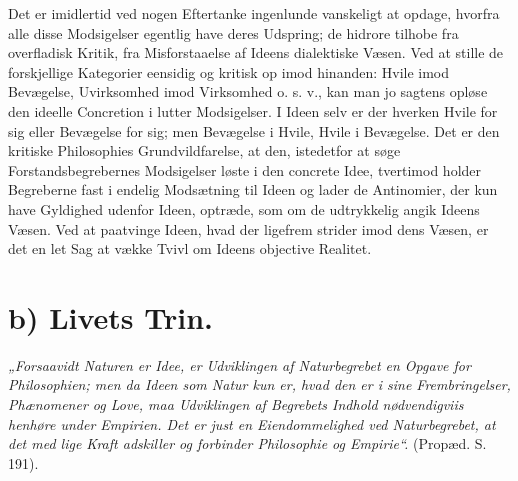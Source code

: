 \documentclass[11pt]{book}
\newcommand{\opage}[1]{\marginnote{\footnotesize\textit{[#1]}}}
\begin{document}
Det er imidlertid ved nogen Eftertanke ingenlunde vanskeligt at opdage,
hvorfra alle disse Modsigelser egentlig have deres Udspring; de hidrore
tilhobe fra overfladisk Kritik, fra Misforstaaelse af Ideens dialektiske
Væsen. Ved at stille de forskjellige Kategorier eensidig og kritisk op imod
hinanden: Hvile imod Bevægelse, Uvirksomhed imod Virksomhed o. s. v., kan
man jo sagtens opløse den ideelle Concretion i lutter Modsigelser. I Ideen
selv er der hverken Hvile for sig eller Bevægelse for sig; men Bevægelse i
Hvile, Hvile i Bevægelse. Det er den kritiske Philosophies Grundvildfarelse,
at den, istedetfor at søge Forstandsbegrebernes Modsigelser løste i den
concrete Idee, tvertimod holder Begreberne fast i endelig Modsætning til
Ideen og lader de Antinomier, der kun have
\opage{286} \setcounter{footnote}{0}%
Gyldighed udenfor Ideen, optræde, som om de udtrykkelig angik
Ideens Væsen. Ved at paatvinge Ideen, hvad der ligefrem strider
imod dens Væsen, er det en let Sag at vække Tvivl om Ideens
objective Realitet.
\chapter*{b) Livets Trin.}

%
\emph{„Forsaavidt Naturen er Idee, er Udviklingen af Naturbegrebet en
Opgave for Philosophien; men da Ideen som Natur kun er, hvad den er i
sine Frembringelser, Phænomener og Love, maa Udviklingen af Begrebets
Indhold nødvendigviis henhøre under Empirien. Det er just en
Eiendommelighed ved Naturbegrebet, at det med lige Kraft adskiller og
forbinder Philosophie og Empirie“.} (Propæd. S. 191).
\end{document}
